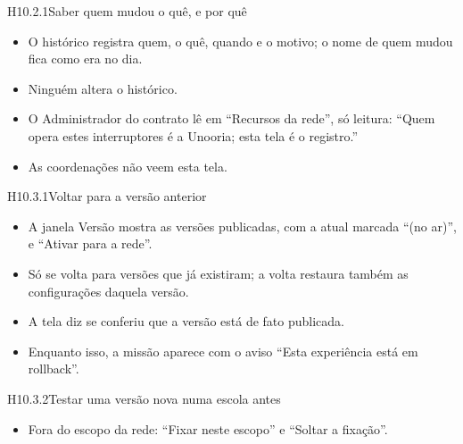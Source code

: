 
\begin{historia}{H10.2.1}{Saber quem mudou o quê, e por quê}{\pronto}
\aceite
\begin{itemize}
  \item O histórico registra quem, o quê, quando e o motivo; o nome de quem
    mudou fica como era no dia.
  \item Ninguém altera o histórico.
  \item O Administrador do contrato lê em \enquote{Recursos da rede}, só
    leitura: \enquote{Quem opera estes interruptores é a Unooria; esta tela é
    o registro.}
  \item As coordenações não veem esta tela.
\end{itemize}
\end{historia}


\begin{historia}{H10.3.1}{Voltar para a versão anterior}{\pronto}
\aceite
\begin{itemize}
  \item A janela Versão mostra as versões publicadas, com a atual marcada
    \enquote{(no ar)}, e \enquote{Ativar para a rede}.
  \item Só se volta para versões que já existiram; a volta restaura também as
    configurações daquela versão.
  \item A tela diz se conferiu que a versão está de fato publicada.
  \item Enquanto isso, a missão aparece com o aviso \enquote{Esta experiência
    está em rollback}.
\end{itemize}
\end{historia}

\begin{historia}{H10.3.2}{Testar uma versão nova numa escola antes}{\pronto}
\aceite
\begin{itemize}
  \item Fora do escopo da rede: \enquote{Fixar neste escopo} e \enquote{Soltar
    a fixação}.
\end{itemize}
\end{historia}


